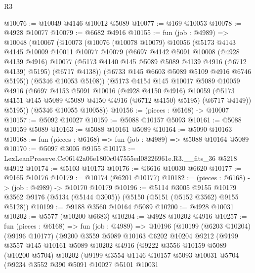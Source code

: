 \begin{lexlean}{R3}
\begin{coremodule}
@10076 := @10049 @4146 @10012 @5089
@10077 := @169 @10053
@10078 := @4928 @10077
@10079 := @6682 @4916
@10155 := fun (job : @4989) =>
  @10048
    (@10067
      (@10073
        (@10076
          (@10078 @10079)
          @10056
          (@5173
            @4143
            @4145
            @10009
            @10011
            @10077
            @10079
            (@6697
              @4142
              @5091
              @10008
              (@4928 @4139 @4916)
              @10077
              (@5173 @4140 @145 @5089 @5089 @4139 @4916 (@6712 @4139) @5195)
              (@6717 @4138))
            (@6733 @145 @6603 @5089 @5109 @4916 @6746 @5195))
          (@5346 @10053 @5108))
        (@5173
          @4154
          @145
          @10017
          @5089
          @10059
          @4916
          (@6697
            @4153
            @5091
            @10016
            (@4928 @4150 @4916)
            @10059
            (@5173 @4151 @145 @5089 @5089 @4150 @4916 (@6712 @4150) @5195)
            (@6717 @4149))
          @5195))
      (@5346 @10055 @10058))
@10156 := (pieces : @6168) -> @10007
@10157 := @5092 @10027
@10159 := @5088 @10157 @5093
@10161 := @5088 @10159 @5089
@10163 := @5088 @10161 @5089
@10164 := @5090 @10163
@10168 := fun (pieces : @6168) => fun (job : @4989) => @5088 @10164 @5089
@10170 := @5097 @3005 @9155
@10173 := LexLeanPreserve.Cc06142a06e1800c047555ed08226961e.R3.__fits_36 @5218 @4912
@10174 := @5103 @10173
@10176 := @6616 @10030 @6620
@10177 := @9165 @10176
@10179 := @10174 (@6201 @10177)
@10182 := (pieces : @6168) -> (job : @4989) -> @10170 @10179
@10196 := @5114
    @3005
    @9155
    @10179
    @3562
    @9176
    (@5134 (@5144 @3005))
    (@5150 (@5151 (@5152 @3562) @9155 @5128))
@10199 := @9188 @3560 @10164 @5089
@10200 := @4928 @10031
@10202 := @5577 (@10200 @6683)
@10204 := @4928 @10202 @4916
@10257 := fun (pieces : @6168) =>
  fun (job : @4989) =>
  @10196
    (@10199
      (@6203 @10204)
      (@9196 @10177)
      (@9200
        @3559
        @5089
        @10163
        @6202
        @10204
        @9212
        (@9199
          @3557
          @145
          @10161
          @5089
          @10202
          @4916
          (@9222
            @3556
            @10159
            @5089
            (@10200 @5704)
            @10202
            (@9199
              @3554
              @1146
              @10157
              @5093
              @10031
              @5704
              (@9234
                @3552
                @390
                @5091
                @10027
                @5101
                @10031

\end{coremodule}
\end{lexlean}
